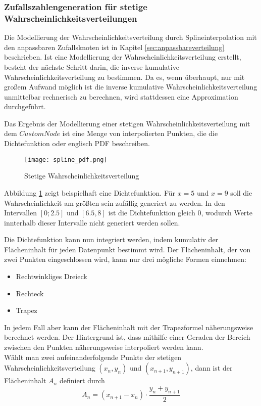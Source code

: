 \subsubsection{Zufallszahlengeneration für stetige Wahrscheinlichkeitsverteilungen}

Die Modellierung der Wahrscheinlichkeitsverteilung durch Splineinterpolation mit den anpassbaren Zufallsknoten ist in Kapitel \ref{sec:anpassbareverteilung} beschrieben. Ist eine Modellierung der Wahrscheinlichkeitsverteilung erstellt, besteht der nächste Schritt darin, die inverse kumulative Wahrscheinlichkeitsverteilung zu bestimmen. Da es, wenn überhaupt, nur mit großem Aufwand möglich ist die inverse kumulative Wahrscheinlichkeitsverteilung unmittelbar rechnerisch zu berechnen, wird stattdessen eine Approximation durchgeführt. 

Das Ergebnis der Modellierung einer stetigen Wahrscheinlichkeitsverteilung mit dem $CustomNode$ ist eine Menge von interpolierten Punkten, die die Dichtefunktion oder englisch \ac{PDF} beschreiben. 

\begin{figure}[H]
    \centering
    \texttt{[image: spline\_pdf.png]}
    \caption{Stetige Wahrscheinlichkeitsverteilung}\label{fig:pdf}
\end{figure}

Abbildung \ref{fig:pdf} zeigt beispielhaft eine Dichtefunktion. Für $x=5$ und $x=9$ soll die Wahrscheinlichkeit am größten sein zufällig generiert zu werden. In den Intervallen $[0;2.5]$ und $[6.5,8]$ ist die Dichtefunktion gleich $0$, wodurch Werte innterhalb dieser Intervalle nicht generiert werden sollen.

Die Dichtefunktion kann nun integriert werden, indem kumulativ der Flächeninhalt für jeden Datenpunkt bestimmt wird. Der Flächeninhalt, der von zwei Punkten eingeschlossen wird, kann nur drei mögliche Formen einnehmen:
\begin{itemize}
    \item Rechtwinkliges Dreieck
    \item Rechteck
    \item Trapez
\end{itemize}
In jedem Fall aber kann der Flächeninhalt mit der Trapezformel näherungsweise berechnet werden. Der Hintergrund ist, dass mithilfe einer Geraden der Bereich zwischen den Punkten näherungsweise interpoliert werden kann.\\
Wählt man zwei aufeinanderfolgende Punkte der stetigen Wahrscheinlichkeitsverteilung $(x_n,y_n)$ und $(x_{n+1},y_{n+1})$, dann ist der Flächeninhalt $A_n$ definiert durch
$$A_n=(x_{n+1}-x_n) \cdot \frac{y_n+y_{n+1}}{2}$$


